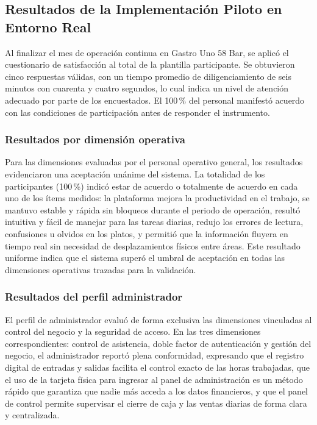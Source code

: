 \subsection{Resultados de la Implementación Piloto en Entorno Real}
\label{subsec:resultados_piloto}

Al finalizar el mes de operación continua en Gastro Uno 58 Bar, se aplicó el cuestionario
de satisfacción al total de la plantilla participante. Se obtuvieron cinco respuestas
válidas, con un tiempo promedio de diligenciamiento de seis minutos con cuarenta y cuatro
segundos, lo cual indica un nivel de atención adecuado por parte de los encuestados.
El 100\,\% del personal manifestó acuerdo con las condiciones de participación antes de
responder el instrumento.

\subsubsection*{Resultados por dimensión operativa}

Para las dimensiones evaluadas por el personal operativo general, los resultados evidenciaron
una aceptación unánime del sistema. La totalidad de los participantes (100\,\%) indicó
estar de acuerdo o totalmente de acuerdo en cada uno de los ítems medidos: la plataforma
mejora la productividad en el trabajo, se mantuvo estable y rápida sin bloqueos durante
el periodo de operación, resultó intuitiva y fácil de manejar para las tareas diarias,
redujo los errores de lectura, confusiones u olvidos en los platos, y permitió que la
información fluyera en tiempo real sin necesidad de desplazamientos físicos entre áreas.
Este resultado uniforme indica que el sistema superó el umbral de aceptación en todas
las dimensiones operativas trazadas para la validación.

\subsubsection*{Resultados del perfil administrador}

El perfil de administrador evaluó de forma exclusiva las dimensiones vinculadas al control
del negocio y la seguridad de acceso. En las tres dimensiones correspondientes: control de
asistencia, doble factor de autenticación y gestión del negocio, el administrador reportó
plena conformidad, expresando que el registro digital de entradas y salidas facilita el
control exacto de las horas trabajadas, que el uso de la tarjeta física para ingresar al
panel de administración es un método rápido que garantiza que nadie más acceda a los datos
financieros, y que el panel de control permite supervisar el cierre de caja y las ventas
diarias de forma clara y centralizada.

